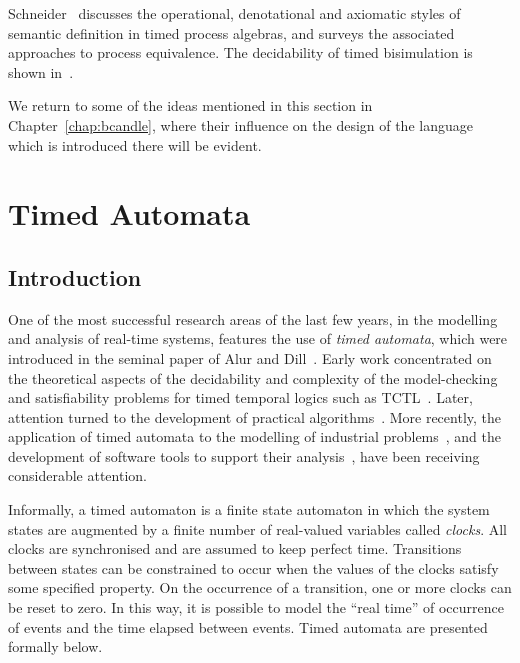 {Schneider~\cite{sch:95} discusses the operational, denotational and
axiomatic styles of semantic definition in timed process algebras, and
surveys the associated approaches to process equivalence. The decidability of
timed bisimulation is shown in~\cite{cer:92}.

We return to some of the ideas mentioned in this section in
Chapter~\ref{chap:bcandle}, where their influence on the design of the
language which is introduced there will be evident.

\section{Timed Automata}\label{sec:mscta}
\subsection{Introduction}
One of the most successful research areas of the last few years, in
the modelling and analysis of real-time systems, features the use of
\emph{timed automata}, which were introduced in the seminal paper of Alur and
Dill~\cite{ad:90}. Early work concentrated on the theoretical aspects
of the decidability and complexity of the model-checking and
satisfiability problems for timed temporal logics such as
TCTL~\cite{acd:90,ad:94,ah:91,alu:91}. Later, attention turned to the
development of practical algorithms~\cite{hnsy:94,ypd:94}. More recently, the
application of timed automata to the modelling of industrial
problems~\cite{hsl:97,lpy:98,ty:98}, and the development of software
tools to support their analysis~\cite{bll:98,bdm:98}, have been
receiving considerable attention.

Informally, a timed automaton is a finite state automaton in which the system
states are augmented by a finite number of real-valued variables called
\emph{clocks}. All clocks are synchronised and are assumed to keep perfect 
time. Transitions between states can be constrained to occur when
the values of the clocks satisfy some specified property. On the
occurrence of a transition, one or more clocks can be reset to
zero. In this way, it is possible to model the ``real time'' of
occurrence of events and the time elapsed between events. Timed automata
are presented formally below.

}
